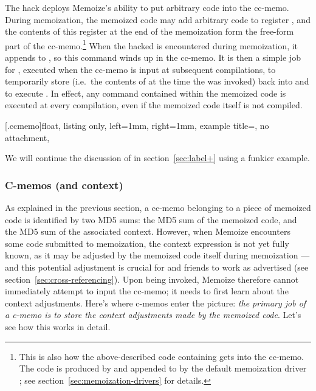\documentclass[a4paper,11pt]{article}
\def\exampledir{examples/}
\begin{document}
The  hack deploys Memoize's ability to put arbitrary code into the
cc-memo.  During memoization, the memoized code may add arbitrary code to
register , and the contents of this register at the end of
the memoization form the free-form part of the cc-memo.\footnote{This is also
  how the above-described code containing  gets into
  the cc-memo.  The code is produced by  and appended
  to  by the default memoization driver
  ; see section~\ref{sec:memoization-drivers} for
  details.}  When the hacked  is encountered during memoization, it
appends  to
, so this command winds up in the cc-memo.  It is then a
simple job for , executed when the cc-memo is input at
subsequent compilations, to temporarily store  (i.e.\
the contents of  at the time the  was invoked) back
into \cs{@currentlabel} and to execute \cs{label}\marg{label name}.  In effect, any
\cs{label} command contained within the memoized code is executed at every
compilation, even if the memoized code itself is not compiled.

\begingroup

[.ccmemo]{float,
  listing only, left=1mm, right=1mm,
  example title=\mymemo,
  no attachment,
}
\endgroup

We will continue the discussion of  in section~\ref{sec:label+} using
a funkier example.


\subsubsection{C-memos (and context)}
\label{sec:c-memos}

As explained in the previous section, a cc-memo belonging to a piece of
memoized code is identified by two MD5 sums: the MD5 sum of the memoized code,
and the MD5 sum of the associated context.  However, when Memoize encounters
some code submitted to memoization, the context expression is not yet fully
known, as it may be adjusted by the memoized code itself during memoization ---
and this potential adjustment is crucial for \cs{ref} and friends to work as
advertised (see section~\ref{sec:cross-referencing}).  Upon being invoked,
Memoize therefore cannot immediately attempt to input the cc-memo; it needs to
first learn about the context adjustments.  Here's where c-memos enter the
picture: \emph{the primary job of a c-memo is to store the context adjustments
  made by the memoized code}.  Let's see how this works in detail.
\end{document}
